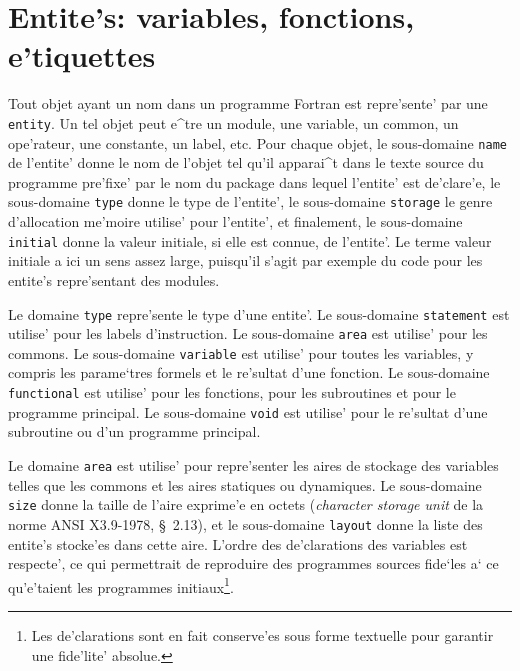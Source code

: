 \section{Entite's: variables, fonctions, e'tiquettes}
\label{entity}

{
Tout objet ayant un nom dans un programme Fortran est repre'sente' par
une \verb/entity/. Un tel objet peut e^tre un module, une variable, un
common, un ope'rateur, une constante, un label, etc. Pour chaque objet,
le sous-domaine \verb/name/ de l'entite' donne le nom de l'objet tel
qu'il apparai^t dans le texte source du programme pre'fixe' par le nom du
package dans lequel l'entite' est de'clare'e, le sous-domaine
\verb/type/ donne le type de l'entite', le sous-domaine \verb/storage/
le genre d'allocation me'moire utilise' pour l'entite', et finalement,
le sous-domaine \verb/initial/ donne la valeur initiale, si elle est
connue, de l'entite'. Le terme valeur initiale a ici un sens assez
large, puisqu'il s'agit par exemple du code pour les entite's
repre'sentant des modules.
}

{
Le domaine \verb/type/ repre'sente le type d'une entite'.  Le
sous-domaine \verb/statement/ est utilise' pour les labels
d'instruction.  Le sous-domaine \verb/area/ est utilise' pour les
commons.  Le sous-domaine \verb/variable/ est utilise' pour toutes les
variables, y compris les parame`tres formels et le re'sultat d'une
fonction.  Le sous-domaine \verb/functional/ est utilise' pour les
fonctions, pour les subroutines et pour le programme principal.  Le
sous-domaine \verb/void/ est utilise' pour le re'sultat d'une subroutine
ou d'un programme principal.
}

{ Le domaine {\tt area} est utilise' pour repre'senter les aires de
stockage des variables telles que les commons et les aires statiques ou
dynamiques. Le sous-domaine {\tt size} donne la taille de l'aire
exprime'e en octets ({\em character storage unit} de la norme ANSI
X3.9-1978, \S~2.13), et le sous-domaine {\tt layout} donne la liste des
entite's stocke'es dans cette aire. L'ordre des de'clarations des
variables est respecte', ce qui permettrait de reproduire des programmes
sources fide`les a` ce qu'e'taient les programmes initiaux\footnote{Les
de'clarations sont en fait conserve'es sous forme textuelle pour
garantir une fide'lite' absolue.}.}

